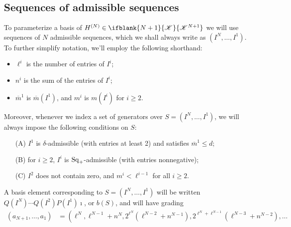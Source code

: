 \documentclass[10pt]{article}
\newcommand{\LL}[1]{\ifblank{#1}{\scrK}{\scrK^{#1}}}
\renewcommand{\Q}{Q}
\newcommand{\SqShift}{\Sq_{\smash{+}}}
\newcommand{\Sq}{\mathrm{Sq}}
\newcommand{\minDim}{m}
\newcommand{\minDimP}{\overline{m}}
\begin{document}
\begin{SequenceOfSequencesIntro}
\subsection{Sequences of admissible sequences}
To parameterize a basis of $H^{(N)}\in\LL{N+1}$ we will use sequences of $N$ admissible sequences, which we shall always write as $(I^N,\ldots,I^1)$. To further simplify notation, we'll employ the following shorthand:
\begin{itemize}
\squishlist
\setlength{\parindent}{.25in}
\item $\ell^i$ is the number of entries of $I^i$;
\item $n^i$ is the sum of the entries of $I^i$;
\item $\minDimP^1$ is $\minDimP(I^1)$, and $\minDim^i$ is $\minDim(I^i)$ for $i\geq2$.
\end{itemize}
Moreover, whenever we index a set of generators over $S=(I^N,\ldots,I^1)$, we will always impose the following conditions on $S$:
\begin{enumerate}[A)]
\squishlist
\setlength{\parindent}{.25in}
\item[\textup{(A)}] $I^1$ is $\delta$-admissible (with entries at least 2) and satisfies $\minDimP^1\leq d$;
\item[\textup{(B)}] for $i\geq2$, $I^i$ is $\SqShift$-admissible (with entries nonnegative);
\item[\textup{(C)}] $I^2$ does not contain zero, and $\minDim^i<\ell^{i-1}$ for all $i\geq2$.
\end{enumerate}
A basis element corresponding to $S=(I^N,\ldots,I^1)$ will be written $\Q(I^N)\cdots \Q(I^2)P(I^1)\imath$, or $b(S)$, and will have grading%
\begin{align*}
 (a_{N+1},\ldots,a_1) &= \left( \ell^N,\ell^{N-1}+n^N,2^{\ell^N}\!\left(\ell^{N-2}+n^{N-1}\right), 2^{\ell^N+\ell^{N-1}}\!\left(\ell^{N-3}+n^{N-2}\right),\ldots \right.\\

\end{align*}
\end{SequenceOfSequencesIntro}
\end{document}
